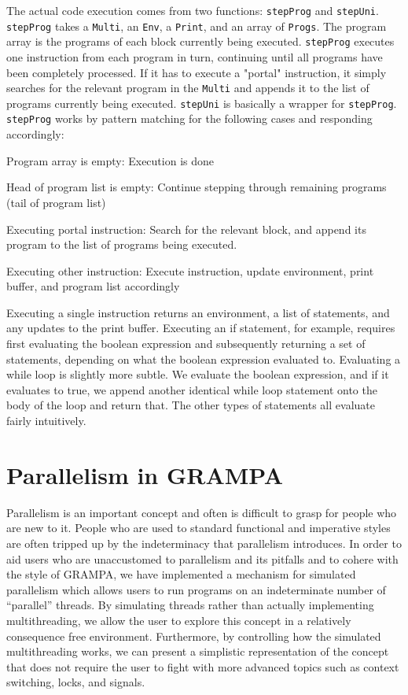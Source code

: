\documentclass[numbers]{sigplanconf}
\begin{document}
The actual code execution comes from two functions: \texttt{stepProg} and \texttt{stepUni}. \texttt{stepProg} takes a \texttt{Multi}, an \texttt{Env}, a \texttt{Print}, and an array of \texttt{Progs}. The program array is the programs of each block currently being executed. \texttt{stepProg} executes one instruction from each program in turn, continuing until all programs have been completely processed. If it has to execute a "portal" instruction, it simply searches for the relevant program in the \texttt{Multi} and appends it to the list of programs currently being executed. \texttt{stepUni} is basically a wrapper for \texttt{stepProg}. \texttt{stepProg} works by pattern matching for the following cases and responding accordingly:
\begin{description}
	\item{Program array is empty: } Execution is done
	\item{Head of program list is empty: } Continue stepping through remaining programs (tail of program list)
	\item{Executing portal instruction: } Search for the relevant block, and append its program to the list of programs being executed.
	\item{Executing other instruction: } Execute instruction, update environment, print buffer, and program list accordingly
\end{description}

Executing a single instruction returns an environment, a list of statements, and any updates to the print buffer. Executing an if statement, for example, requires first evaluating the boolean expression and subsequently returning a set of statements, depending on what the boolean expression evaluated to. Evaluating a while loop is slightly more subtle. We evaluate the boolean expression, and if it evaluates to true, we append another identical while loop statement onto the body of the loop and return that. The other types of statements all evaluate fairly intuitively.

\section{Parallelism in GRAMPA}
Parallelism is an important concept and often is difficult to grasp for people who are new to it. People who are used to standard functional and imperative styles are often tripped up by the indeterminacy that parallelism introduces. In order to aid users who are unaccustomed to parallelism and its pitfalls and to cohere with the style of GRAMPA, we have implemented a mechanism for simulated parallelism which allows users to run programs on an indeterminate number of “parallel” threads. By simulating threads rather than actually implementing multithreading, we allow the user to explore this concept in a relatively consequence free environment. Furthermore, by controlling how the simulated multithreading works, we can present a simplistic representation of the concept that does not require the user to fight with more advanced topics such as context switching, locks, and signals.
	
\end{document}
